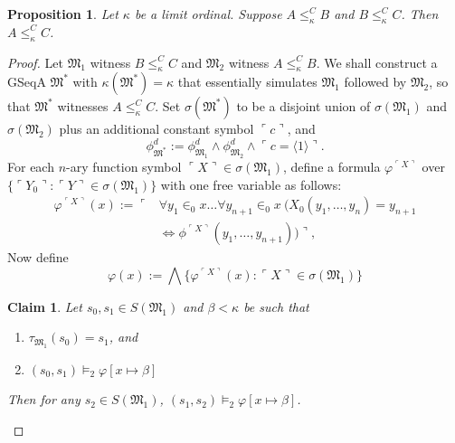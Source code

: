 \documentclass[12pt, twoside]{memoir}
\numberwithin{equation}{section}
\newtheorem{prop}[thm]{Proposition}
\newtheorem{claim2}[thm]{Claim}
\theoremstyle{definition}
\theoremstyle{remark}
\theoremstyle{definition}
\theoremstyle{definition}
\theoremstyle{definition}
\theoremstyle{remark}
\begin{document}
\begin{prop}\label{prop245}
Let $\kappa$ be a limit ordinal. Suppose $A \leq^C_{\kappa} B$ and $B \leq^C_{\kappa} C$. Then $A \leq^C_{\kappa} C$.
\end{prop}

\begin{proof}
Let $\mathfrak{M}_1$ witness $B \leq^C_{\kappa} C$ and $\mathfrak{M}_2$ witness $A \leq^C_{\kappa} B$. We shall construct a GSeqA $\mathfrak{M}^*$ with $\kappa(\mathfrak{M}^*) = \kappa$ that essentially simulates $\mathfrak{M}_1$ followed by $\mathfrak{M}_2$, so that $\mathfrak{M}^*$ witnesses $A \leq^C_{\kappa} C$. Set $\sigma(\mathfrak{M}^*)$ to be a disjoint union of $\sigma(\mathfrak{M}_1)$ and $\sigma(\mathfrak{M}_2)$ plus an additional constant symbol $\ulcorner c \urcorner$, and 
\begin{equation*}
    \phi^d_{\mathfrak{M}^*} := \phi^d_{\mathfrak{M}_1} \wedge \phi^d_{\mathfrak{M}_2} \wedge \ulcorner c = \langle 1 \rangle \urcorner \text{.}
\end{equation*}
For each $n$-ary function symbol $\ulcorner X \urcorner \in \sigma(\mathfrak{M}_1)$, define a formula $\varphi^{\ulcorner X \urcorner}$ over $\{\ulcorner Y_0 \urcorner : \ulcorner Y \urcorner \in \sigma(\mathfrak{M}_1)\}$ with one free variable as follows:
\begin{align*}
    \varphi^{\ulcorner X \urcorner}(x) := \ulcorner & \forall y_1 \in_0 x \dots \forall y_{n+1} \in_0 x \ (X_0(y_1, \dots, y_n) = y_{n+1} \\ 
    & \iff \phi^{\ulcorner X \urcorner}(y_1, \dots, y_{n+1})) \urcorner \text{,}
\end{align*}
Now define 
\begin{equation*}
    \varphi(x) := \bigwedge \{\varphi^{\ulcorner X \urcorner}(x) : \ulcorner X \urcorner \in \sigma(\mathfrak{M}_1)\}
\end{equation*}

\begin{claim2}\label{834c}
Let $s_0, s_1 \in S(\mathfrak{M}_1)$ and $\beta < \kappa$ be such that 
\begin{enumerate}[label=(\roman*)]
    \item\label{834ci} $\tau_{\mathfrak{M}_1}(s_0) = s_1$, and
    \item\label{834ciii} $(s_0, s_1) \models_2 \varphi[x \mapsto \beta]$ 
\end{enumerate}
Then for any $s_2 \in S(\mathfrak{M}_1)$, $(s_1, s_2) \models_2 \varphi[x \mapsto \beta]$.
\end{claim2}


\end{proof}
\end{document}

